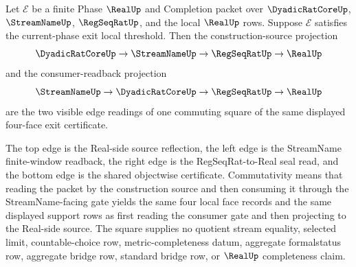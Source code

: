 \begin{theorem}
\label{thm:real-l10-construction-consumer-order-square}
Let $\mathcal E$ be a finite Phase $\RealUp$ and Completion packet over $\DyadicRatCoreUp$, $\StreamNameUp$, $\RegSeqRatUp$, and the local $\RealUp$ rows. Suppose $\mathcal E$ satisfies the current-phase exit local threshold. Then the construction-source projection
$$
\DyadicRatCoreUp \to \StreamNameUp \to \RegSeqRatUp \to \RealUp
$$
and the consumer-readback projection
$$
\StreamNameUp \to \DyadicRatCoreUp \to \RegSeqRatUp \to \RealUp
$$
are the two visible edge readings of one commuting square of the same displayed four-face exit certificate.

The top edge is the Real-side source reflection, the left edge is the StreamName finite-window readback, the right edge is the RegSeqRat-to-Real seal read, and the bottom edge is the shared objectwise certificate. Commutativity means that reading the packet by the construction source and then consuming it through the StreamName-facing gate yields the same four local face records and the same displayed support rows as first reading the consumer gate and then projecting to the Real-side source. The square supplies no quotient stream equality, selected limit, countable-choice row, metric-completeness datum, aggregate formalstatus row, aggregate bridge row, standard bridge row, or $\RealUp$ completeness claim.
\end{theorem}
